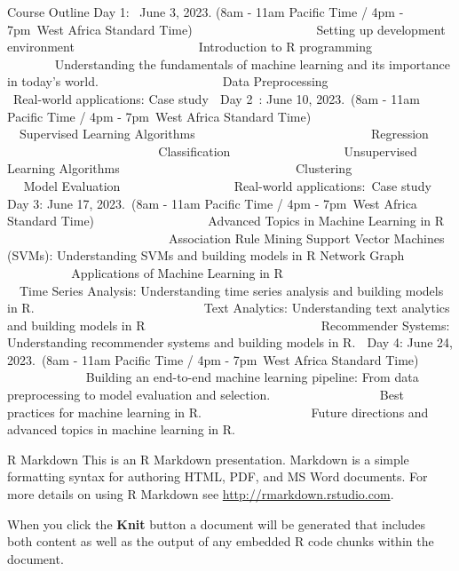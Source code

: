 \documentclass[
  ignorenonframetext,
]{beamer}
\begin{document}
\begin{frame}{Course Outline}
\protect\hypertarget{course-outline}{}
Day 1:~ June 3, 2023. (8am - 11am Pacific Time / 4pm - 7pm~West Africa
Standard Time) ~ ~ ~ ~ ~ ~ ~ ~ ~ ~ ~ ~Setting up development environment
~ ~ ~ ~ ~ ~ ~ ~ ~ ~ ~ ~Introduction to R programming~ ~ ~ ~ ~ ~ ~ ~ ~ ~
~ ~ ~Understanding the fundamentals of machine learning and its
importance in today's world. ~ ~ ~ ~ ~ ~ ~ ~ ~ ~ ~ ~Data Preprocessing ~
~ ~ ~ ~ ~ ~ ~ ~ ~ ~ ~Real-world applications: Case study  Day 2~: June
10, 2023.~(8am - 11am Pacific Time / 4pm - 7pm~West Africa Standard
Time)~ ~ ~ ~ ~ ~ ~ ~ ~ ~ ~ ~~Supervised Learning Algorithms ~ ~ ~ ~ ~ ~
~ ~ ~ ~ ~ ~ ~ ~ ~ ~ ~Regression ~ ~ ~ ~ ~ ~ ~ ~ ~ ~ ~ ~ ~ ~ ~ ~
~Classification ~ ~ ~ ~ ~ ~ ~ ~ ~ ~ ~Unsupervised Learning Algorithms ~
~ ~ ~ ~ ~ ~ ~ ~ ~ ~ ~ ~ ~ ~ ~ ~Clustering ~ ~ ~ ~ ~ ~ ~ ~ ~ ~ ~Model
Evaluation ~ ~ ~ ~ ~ ~ ~ ~ ~ ~ ~Real-world applications:~Case study 
Day 3: June 17, 2023.~(8am - 11am Pacific Time / 4pm - 7pm~West Africa
Standard Time) ~ ~ ~ ~ ~ ~ ~ ~ ~ ~ ~Advanced Topics in Machine Learning
in R ~ ~ ~ ~ ~ ~ ~ ~ ~ ~ ~ ~ ~ ~ ~ ~ ~Association Rule Mining Support
Vector Machines (SVMs): Understanding SVMs and building models in R
Network Graph ~ ~ ~ ~ ~ ~ ~ ~ ~ ~~Applications of Machine Learning in R
~ ~ ~ ~ ~ ~ ~ ~ ~ ~ ~ ~ ~ ~ ~ ~~Time Series Analysis: Understanding time
series analysis and building models in R. ~ ~ ~ ~ ~ ~ ~ ~ ~ ~ ~ ~ ~ ~ ~
~ Text Analytics: Understanding text analytics and building models in R
~ ~ ~ ~ ~ ~ ~ ~ ~ ~ ~ ~ ~ ~ ~ ~ ~Recommender Systems: Understanding
recommender systems and building models in R.  Day 4: June 24,
2023.~(8am - 11am Pacific Time / 4pm - 7pm~West Africa Standard Time) ~
~ ~ ~ ~ ~ ~ ~ ~ ~ ~Building an end-to-end machine learning pipeline:
From data preprocessing to model evaluation and selection. ~ ~ ~ ~ ~ ~ ~
~ ~ ~~Best practices for machine learning in R. ~ ~ ~ ~ ~ ~ ~ ~ ~
~~Future directions and advanced topics in machine learning in R.
\end{frame}

\begin{frame}{R Markdown}
\protect\hypertarget{r-markdown}{}
This is an R Markdown presentation. Markdown is a simple formatting
syntax for authoring HTML, PDF, and MS Word documents. For more details
on using R Markdown see \url{http://rmarkdown.rstudio.com}.

When you click the \textbf{Knit} button a document will be generated
that includes both content as well as the output of any embedded R code
chunks within the document.
\end{frame}
\end{document}
